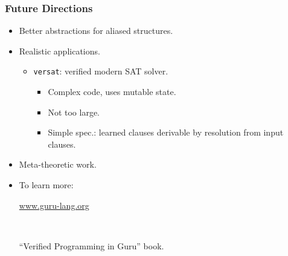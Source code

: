 \documentclass[10pt]{beamer}
\begin{document}
\begin{frame}
\frametitle{Future Directions}

\begin{itemize}
\item Better abstractions for aliased structures.

\item Realistic applications.

\begin{itemize}
\item \texttt{versat}: verified modern SAT solver.
\begin{itemize}
\item Complex code, uses mutable state.
\item Not too large.
\item Simple spec.: learned clauses derivable by resolution from input clauses.
\end{itemize}
\end{itemize}

\item Meta-theoretic work.

\item To learn more:

\begin{center}
\Large
\textcolor{blue}{\url{www.guru-lang.org}}
\end{center}

\ 

``Verified Programming in Guru'' book.

\end{itemize}

\end{frame}
\end{document}
